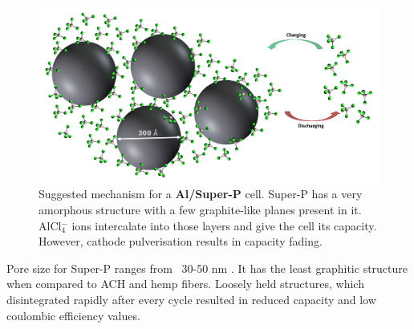  \begin{figure}[tbh!]
  \centering
  \includegraphics[width=\textwidth]{Figures/chap5fig/superpmech}
    \caption{Suggested mechanism for a \textbf{Al/Super-P} cell. Super-P has a very amorphous structure with a few graphite-like planes present in it. AlCl$_{4}^{-}$ ions intercalate into those layers and give the cell its capacity. However, cathode pulverisation results in capacity fading.}
  \label{Figures/chap5figs:superPmech}
\end{figure}
Pore size for Super-P ranges from ~30-50 nm \cite{younesi_analysis_2015}. It has the least graphitic structure when compared to ACH and hemp fibers. Loosely held structures, which disintegrated rapidly after every cycle resulted in reduced capacity and low coulombic efficiency values.


